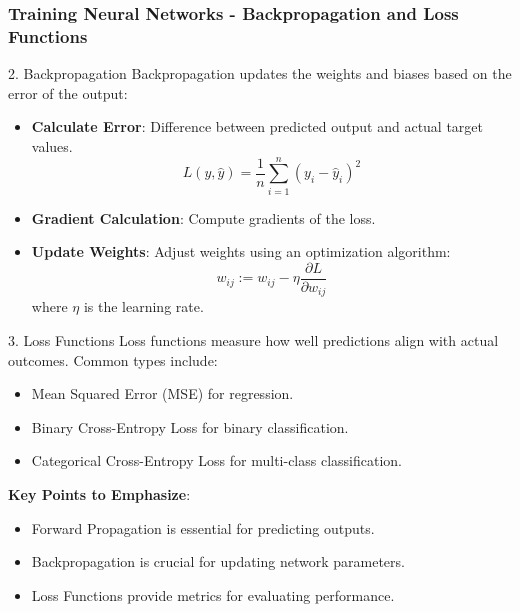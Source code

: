 \documentclass[aspectratio=169]{beamer}
\begin{document}
\begin{frame}[fragile]
    \frametitle{Training Neural Networks - Backpropagation and Loss Functions}
    \begin{block}{2. Backpropagation}
        Backpropagation updates the weights and biases based on the error of the output:
        \begin{itemize}
            \item \textbf{Calculate Error}: Difference between predicted output and actual target values.
            \begin{equation}
                L(y, \hat{y}) = \frac{1}{n} \sum_{i=1}^{n} (y_i - \hat{y}_i)^2
            \end{equation}
            \item \textbf{Gradient Calculation}: Compute gradients of the loss.
            \item \textbf{Update Weights}: Adjust weights using an optimization algorithm:
            \begin{equation}
                w_{ij} := w_{ij} - \eta \frac{\partial L}{\partial w_{ij}}
            \end{equation}
            where \(\eta\) is the learning rate.
        \end{itemize}
    \end{block}

    \begin{block}{3. Loss Functions}
        Loss functions measure how well predictions align with actual outcomes. Common types include:
        \begin{itemize}
            \item Mean Squared Error (MSE) for regression.
            \item Binary Cross-Entropy Loss for binary classification.
            \item Categorical Cross-Entropy Loss for multi-class classification.
        \end{itemize}
        
        \textbf{Key Points to Emphasize}:
        \begin{itemize}
            \item Forward Propagation is essential for predicting outputs.
            \item Backpropagation is crucial for updating network parameters.
            \item Loss Functions provide metrics for evaluating performance.
        \end{itemize}
    \end{block}
\end{frame}
\end{document}
